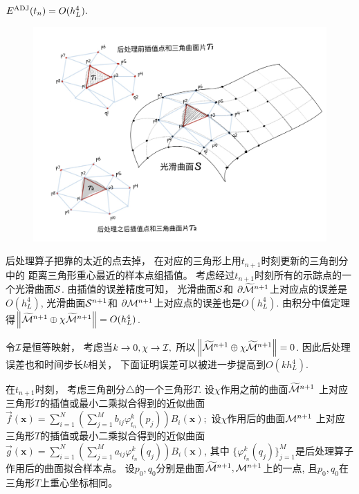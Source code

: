 \begin{prop}
  $E^{\textmd{ADJ}}(t_n)=O(h_L^4).$
\end{prop}
\begin{pro}
  \begin{figure}[H]
    \centering
    \includegraphics[width=0.7\linewidth]{fig/share}
    \label{fig:share}
  \end{figure}
 后处理算子把靠的太近的点去掉，
 在对应的三角形上用$t_{n+1}$时刻更新的三角剖分中的
 距离三角形重心最近的样本点组插值。
 考虑经过$t_{n+1}$时刻所有的示踪点的一个光滑曲面${\cal S}$.
 由插值的误差精度可知，
 光滑曲面${\cal S}$和
 $\partial\widetilde{{\cal M}}^{n+1}$上对应点的误差是$O(h_L^4)$,
  光滑曲面${\cal S}^{n+1}$和
  $\partial{\cal M}^{n+1}$上对应点的误差也是$O(h_L^4).$
  由积分中值定理得$\left\lVert\widetilde{{\cal M}}^{n+1}\oplus \chi
    \widetilde{{\cal M}}^{n+1}\right\rVert=O(h_L^4)$.
  
令${\cal I}$是恒等映射，
考虑当$k\rightarrow 0,\chi \rightarrow {\cal I},$
所以$\left\lVert\widetilde{{\cal M}}^{n+1}\oplus \chi
    \widetilde{{\cal M}}^{n+1}\right\rVert=0$.
  因此后处理误差也和时间步长$k$相关，
  下面证明误差可以被进一步提高到$O(kh_L^4).$
  
  在$t_{n+1}$时刻，
  考虑三角剖分$\triangle$的一个三角形$T$.
  设$\chi$作用之前的曲面$\widetilde{{\cal M}}^{n+1}$
  上对应三角形$T$的插值或最小二乘拟合得到的近似曲面
   $\vec{f}(\mathbf{x})=\sum_{i=1}^{N}
   (\sum_{j=1}^{M}b_{ij}\varphi^k_{t_n}(p_j))B_i(\mathbf{x});$
    设$\chi$作用后的曲面${\cal M}^{n+1}$
  上对应三角形$T$的插值或最小二乘拟合得到的近似曲面
   $\vec{g}(\mathbf{x})=\sum_{i=1}^{N}
   (\sum_{j=1}^{M}a_{ij}\varphi^k_{t_n}(q_j))B_i(\mathbf{x})$,
   其中
   $\{\varphi^k_{t_n}(q_j)\}_{j=1}^M$是后处理算子作用后的曲面拟合样本点。
   设$p_0,q_0$分别是曲面$\widetilde{{\cal M}}^{n+1},
   {\cal M}^{n+1}$上的一点,
   且$p_0,q_0$在三角形$T$上重心坐标相同。
  

\end{pro}
